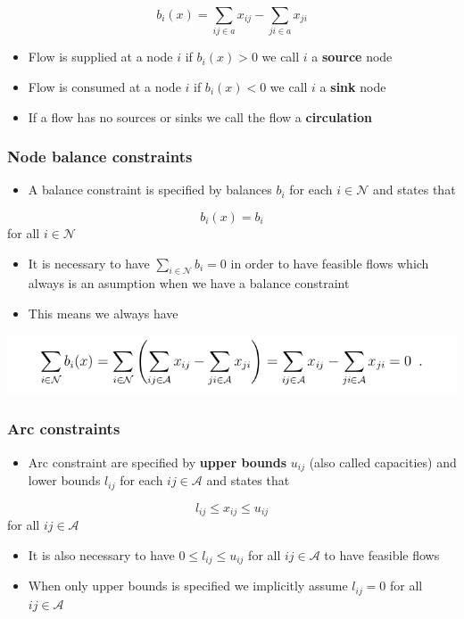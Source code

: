 \documentclass[11pt]{article}
\begin{document}
\begin{equation}
  b_i(x) = \sum_{ij \in a} x_{ij} - \sum_{ji \in a} x_{ji}
\end{equation}
\begin{itemize}
\item Flow is supplied at a node \(i\) if \(b_i(x) > 0\) we call \(i\) a \textbf{source} node
\item Flow is consumed at a node \(i\) if \(b_i(x) < 0\) we call \(i\) a \textbf{sink} node
\item If a flow has no sources or sinks we call the flow a \textbf{circulation}
\end{itemize}

\subsubsection{Node balance constraints}
\label{sec:org6a71b8b}
\begin{itemize}
\item A balance constraint is specified by balances \(b_i\) for each \(i \in \mathcal N\) and states that
\end{itemize}
\begin{equation}
 	b_i(x) = b_i 
\end{equation} 
for all \(i \in \mathcal N\)
\begin{itemize}
\item It is necessary to have \(\sum_{i \in \mathcal N} b_i = 0\) in  order to have feasible flows which always is an asumption when we have a balance constraint
\item This means we always have
\end{itemize}
\begin{center}
\includegraphics[width=.9\linewidth]{Network Flows/screenshot_2019-02-27_13-17-15.png}
\end{center}

\subsubsection{Arc constraints}
\label{sec:orgce64555}
\begin{itemize}
\item Arc constraint are specified by \textbf{upper bounds} \(u_{ij}\) (also called capacities) and lower bounds \(l_{ij}\) for each \(ij \in \mathcal A\) and states that
\end{itemize}
\begin{equation}
  l_{ij} \leq x_{ij} \leq u_{ij}
\end{equation}
for all \(ij \in \mathcal A\)
\begin{itemize}
\item It is also necessary to have \(0 \leq l_{ij} \leq u_{ij}\) for all \(ij \in \mathcal A\) to have feasible flows
\item When only upper bounds is specified we implicitly assume \(l_{ij} = 0\) for all \(ij \in \mathcal A\)
\end{itemize}
\end{document}
